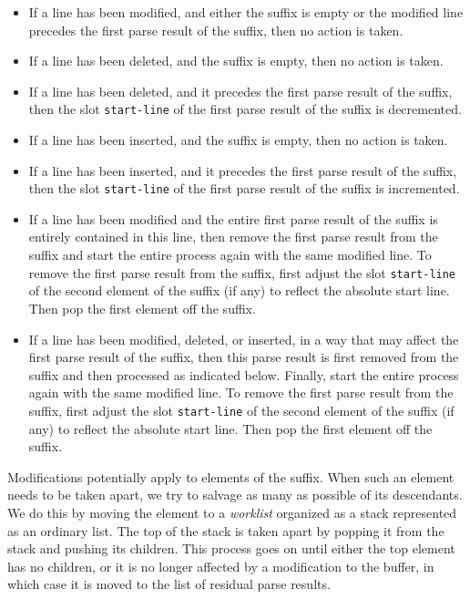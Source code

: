 \begin{itemize}
\item If a line has been modified, and either the suffix is empty or
  the modified line precedes the first parse result of the suffix,
  then no action is taken.
\item If a line has been deleted, and the suffix is empty, then no
  action is taken.
\item If a line has been deleted, and it precedes the first parse
  result of the suffix, then the slot \texttt{start-line} of the first
  parse result of the suffix is decremented.
\item If a line has been inserted, and the suffix is empty, then no
  action is taken.
\item If a line has been inserted, and it precedes the first parse
  result of the suffix, then the slot \texttt{start-line} of the first
  parse result of the suffix is incremented.
\item If a line has been modified and the entire first parse result of
  the suffix is entirely contained in this line, then remove the first
  parse result from the suffix and start the entire process again with
  the same modified line.  To remove the first parse result from the
  suffix, first adjust the slot \texttt{start-line} of the second
  element of the suffix (if any) to reflect the absolute start line.
  Then pop the first element off the suffix.
\item If a line has been modified, deleted, or inserted, in a way that
  may affect the first parse result of the suffix, then this parse
  result is first removed from the suffix and then processed as
  indicated below.  Finally, start the entire process again with the
  same modified line.  To remove the first parse result from the
  suffix, first adjust the slot \texttt{start-line} of the second
  element of the suffix (if any) to reflect the absolute start line.
  Then pop the first element off the suffix.
\end{itemize}

Modifications potentially apply to elements of the suffix.  When such
an element needs to be taken apart, we try to salvage as many as
possible of its descendants.  We do this by moving the element to a
\emph{worklist} organized as a stack represented as an ordinary
\commonlisp{} list.  The top of the stack is taken apart by popping it
from the stack and pushing its children.  This process goes on until
either the top element has no children, or it is no longer affected by
a modification to the buffer, in which case it is moved to the list of
residual parse results.

